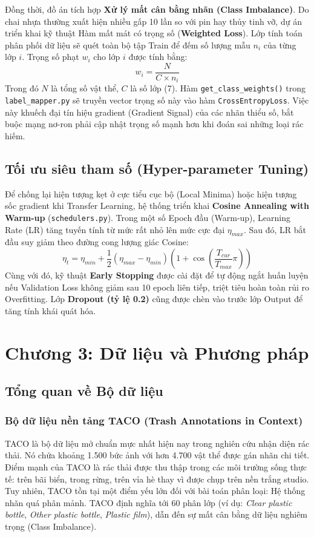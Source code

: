 \documentclass[12pt, a4paper]{article}
\begin{document}
Đồng thời, đồ án tích hợp \textbf{Xử lý mất cân bằng nhãn (Class Imbalance)}. Do chai nhựa thường xuất hiện nhiều gấp 10 lần so với pin hay thủy tinh vỡ, dự án triển khai kỹ thuật Hàm mất mát có trọng số (\textbf{Weighted Loss}). Lớp tính toán phân phối dữ liệu sẽ quét toàn bộ tập Train để đếm số lượng mẫu $n_i$ của từng lớp $i$. Trọng số phạt $w_i$ cho lớp $i$ được tính bằng:
\begin{equation}
w_i = \frac{N}{C \times n_i}
\end{equation}
Trong đó $N$ là tổng số vật thể, $C$ là số lớp (7). Hàm \texttt{get\_class\_weights()} trong \texttt{label\_mapper.py} sẽ truyền vector trọng số này vào hàm \texttt{CrossEntropyLoss}. Việc này khuếch đại tín hiệu gradient (Gradient Signal) của các nhãn thiểu số, bắt buộc mạng nơ-ron phải cập nhật trọng số mạnh hơn khi đoán sai những loại rác hiếm.

\subsection{Tối ưu siêu tham số (Hyper-parameter Tuning)}
Để chống lại hiện tượng kẹt ở cực tiểu cục bộ (Local Minima) hoặc hiện tượng sốc gradient khi Transfer Learning, hệ thống triển khai \textbf{Cosine Annealing with Warm-up} (\texttt{schedulers.py}). Trong một số Epoch đầu (Warm-up), Learning Rate (LR) tăng tuyến tính từ mức rất nhỏ lên mức cực đại $\eta_{max}$. Sau đó, LR bắt đầu suy giảm theo đường cong lượng giác Cosine:
\begin{equation}
\eta_t = \eta_{min} + \frac{1}{2}(\eta_{max} - \eta_{min}) \left(1 + \cos \left( \frac{T_{cur}}{T_{max}}\pi \right)\right)
\end{equation}
Cùng với đó, kỹ thuật \textbf{Early Stopping} được cài đặt để tự động ngắt huấn luyện nếu Validation Loss không giảm sau 10 epoch liên tiếp, triệt tiêu hoàn toàn rủi ro Overfitting. Lớp \textbf{Dropout (tỷ lệ 0.2)} cũng được chèn vào trước lớp Output để tăng tính khái quát hóa.


\section{Chương 3: Dữ liệu và Phương pháp}
\subsection{Tổng quan về Bộ dữ liệu}
\subsubsection{Bộ dữ liệu nền tảng TACO (Trash Annotations in Context)}
TACO là bộ dữ liệu mở chuẩn mực nhất hiện nay trong nghiên cứu nhận diện rác thải. Nó chứa khoảng 1.500 bức ảnh với hơn 4.700 vật thể được gán nhãn chi tiết. Điểm mạnh của TACO là rác thải được thu thập trong các môi trường sống thực tế: trên bãi biển, trong rừng, trên vỉa hè thay vì được chụp trên nền trắng studio.
Tuy nhiên, TACO tồn tại một điểm yếu lớn đối với bài toán phân loại: Hệ thống nhãn quá phân mảnh. TACO định nghĩa tới 60 phân lớp (ví dụ: \textit{Clear plastic bottle}, \textit{Other plastic bottle}, \textit{Plastic film}), dẫn đến sự mất cân bằng dữ liệu nghiêm trọng (Class Imbalance).
\end{document}
